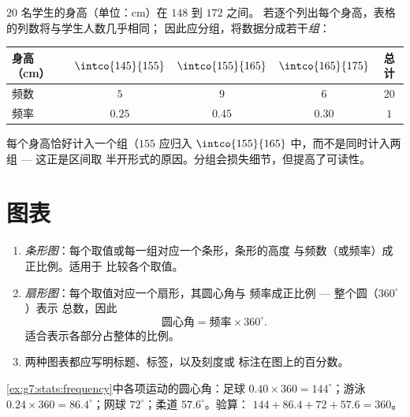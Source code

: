 \begin{example}[分组]\label{ex:g7:stats:classes}
$20$ 名学生的身高（单位：cm）在 $148$ 到 $172$ 之间。
若逐个列出每个身高，表格的列数将与学生人数几乎相同；
因此应分组，将数据分成若干\emph{组}：
\begin{center}
\renewcommand{\arraystretch}{1.3}
\begin{tabular}{l|ccc|c}
身高（cm） & $\intco{145}{155}$ & $\intco{155}{165}$ &
$\intco{165}{175}$ & 总计 \\
\hline
频数 & $5$ & $9$ & $6$ & $20$ \\
频率 & $0.25$ & $0.45$ & $0.30$ & $1$ \\
\end{tabular}
\end{center}
每个身高恰好计入一个组（$155$ 应归入
$\intco{155}{165}$ 中，而不是同时计入两组 --- 这正是区间取
半开形式的原因。分组会损失细节，但提高了可读性。
\end{example}

\section{图表}

\begin{method}[选择并绘制图表]\label{met:g7:stats:charts}
\begin{enumerate}
  \item \emph{条形图}：每个取值或每一组对应一个条形，条形的高度
        与频数（或频率）成正比例。适用于
        比较各个取值。
  \item \emph{扇形图}：每个取值对应一个扇形，其圆心角与
        频率成正比例 --- 整个圆（$360^\circ$）表示
        总数，因此
        \[
        \text{圆心角} = \text{频率} \times 360^\circ .
        \]
        适合表示各部分占整体的比例。
  \item 两种图表都应写明标题、标签，以及刻度或
        标注在图上的百分数。
\end{enumerate}
\end{method}

\begin{example}\label{ex:g7:stats:pie}
\cref{ex:g7:stats:frequency}中各项运动的圆心角：足球
$0.40 \times 360 = 144^\circ$；游泳 $0.24 \times 360 =
86.4^\circ$；网球 $72^\circ$；柔道 $57.6^\circ$。验算：
$144 + 86.4 + 72 + 57.6 = 360$。
\end{example}

